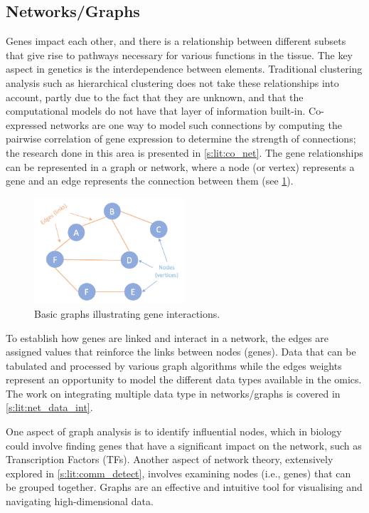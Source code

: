 \subsection{Networks/Graphs} \label{s:lit:graph_overview}

Genes impact each other, and there is a relationship between different subsets that give rise to pathways necessary for various functions in the tissue. The key aspect in genetics is the interdependence between elements. Traditional clustering analysis such as hierarchical clustering does not take these relationships into account, partly due to the fact that they are unknown, and that the computational models do not have that layer of information built-in. Co-expressed networks are one way to model such connections by computing the pairwise correlation of gene expression to determine the strength of connections; the research done in this area is presented in \cref{s:lit:co_net}. The gene relationships can be represented in a graph or network, where a node (or vertex) represents a gene and an edge represents the connection between them (see \cref{fig:graphs_basic}).

\begin{figure}[!htb]
  \centering\includegraphics[width=0.5\textwidth,height=0.5\textheight,keepaspectratio]{Sections/Lit_review/Resources/basic_graphs.png}
    \caption{Basic graphs illustrating gene interactions.}
    \label{fig:graphs_basic}
\end{figure}

To establish how genes are linked and interact in a network, the edges are assigned values that reinforce the links between nodes (genes). Data that can be tabulated and processed by various graph algorithms while the edges weights represent an opportunity to model the different data types available in the omics. The work on integrating multiple data type in networks/graphs is covered in \cref{s:lit:net_data_int}.

One aspect of graph analysis is to identify influential nodes, which in biology could involve finding genes that have a significant impact on the network, such as Transcription Factors (TFs). Another aspect of network theory, extensively explored in \cref{s:lit:comm_detect}, involves examining nodes (i.e., genes) that can be grouped together. Graphs are an effective and intuitive tool for visualising and navigating high-dimensional data.

